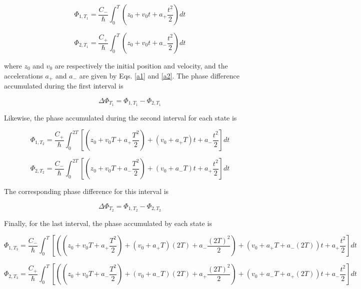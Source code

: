 \documentclass{article}
\begin{document}
\begin{equation}\label{phi1t1}
\Phi_{1, T_{1}} = \frac{C_{-}}{\hbar} \int_{0}^{T} (z_{0}+v_{0}t+a_{+} \frac{t^{2}}{2})dt
\end{equation}

\begin{equation}
\Phi_{2, T_{1}} = \frac{C_{+}}{\hbar} \int_{0}^{T} (z_{0}+v_{0}t+a_{-} \frac{t^{2}}{2})dt
\end{equation}

where $z_{0}$ and $v_{0}$ are respectively the initial position and velocity,
and the accelerations $a_{+}$ and $a_{-}$ are given by Eqs. \ref{a1} and \ref{a2}. The phase difference accumulated during the first interval is

\begin{equation}
\Delta \Phi_{T_{1}} = \Phi_{1, T_{1}} - \Phi_{2, T_{1}}
\end{equation}

Likewise, the phase accumulated during the second interval for each state is

\begin{equation}
\Phi_{1, T_{2}} = \frac{C_{+}}{\hbar} \int_{0}^{2T} [(z_{0}+v_{0}T+a_{+} \frac{T^{2}}{2}) + (v_{0}+a_{+}T)t + a_{-} \frac{t^{2}}{2}]dt
\end{equation}

\begin{equation}
\Phi_{2, T_{2}} = \frac{C_{-}}{\hbar} \int_{0}^{2T} [(z_{0}+v_{0}T+a_{-} \frac{T^{2}}{2}) + (v_{0}+a_{-}T)t + a_{+} \frac{t^{2}}{2}]dt
\end{equation}

The corresponding phase difference for this interval is

\begin{equation}
\Delta \Phi_{T_{2}} = \Phi_{1, T_{2}} - \Phi_{2, T_{2}}
\end{equation}

Finally, for the last interval, the phase accumulated by each state is

\begin{equation}
\Phi_{1, T_{3}} = \frac{C_{-}}{\hbar} \int_{0}^{T} [((z_{0}+v_{0}T+a_{+} \frac{T^{2}}{2}) + (v_{0}+a_{+}T)(2T) + a_{-} \frac{(2T)^{2}}{2}) + (v_{0}+a_{+}T + a_{-}(2T))t + a_{+} \frac{t^{2}}{2}]dt
\end{equation}

\begin{equation}
\Phi_{2, T_{3}} = \frac{C_{+}}{\hbar} \int_{0}^{T} [((z_{0}+v_{0}T+a_{-} \frac{T^{2}}{2}) + (v_{0}+a_{-}T)(2T) + a_{+} \frac{(2T)^{2}}{2}) + (v_{0}+a_{-}T + a_{+}(2T))t + a_{-} \frac{t^{2}}{2}]dt
\end{equation}
\end{document}
